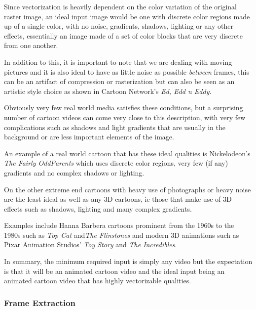 \documentclass[12pt]{article}
\newcommand{\sentence}{} %
\newcommand{\italic}[1]{\textit{#1}}
\begin{document}
    \bigskip
    Since vectorization is heavily dependent on the color variation of the original raster image, an ideal input
    image would be one with discrete color regions made up of a single color, with no noise, gradients, shadows,
    lighting or any other effects, essentially an image made of a set of color blocks that are very discrete from one
    another.
    \sentence
    In addition to this, it is important to note that we are dealing with moving pictures and it is also ideal to
    have as little noise as possible \italic{between} frames, this can be an artifact of compression or
    rasterization but can also be seen as an artistic style choice as shown in Cartoon Network's
    \italic{Ed, Edd n Eddy}.
    \sentence
    Obviously very few real world media satisfies these conditions, but a surprising number of cartoon videos can come
    very close to this description, with very few complications such as shadows and light gradients that are usually
    in the background or are less important elements of the image.
    \sentence
    An example of a real world cartoon that has these ideal qualities is Nickelodeon's \italic{The Fairly OddParents}
    which uses discrete color regions, very few (if any) gradients and no complex shadows or lighting.
    \sentence
    On the other extreme end cartoons with heavy use of photographs or heavy noise are the least ideal as well as
    any 3D cartoons, ie those that make use of 3D effects such as shadows, lighting and many complex gradients.
    \sentence
    Examples include Hanna Barbera cartoons prominent from the 1960s to the 1980s such as \italic{Top Cat}
    and\italic{The Flinstones} and modern 3D animations such as Pixar Animation Studios'
    \italic{Toy Story} and \italic{The Incredibles}.
    \sentence
    In summary, the minimum required input is simply any video but the expectation is that it will be an
    animated cartoon video and the ideal input being an animated cartoon video that has highly vectorizable qualities.


    \subsubsection{Frame Extraction}\label{subsubsec:frame-extraction}
\end{document}
